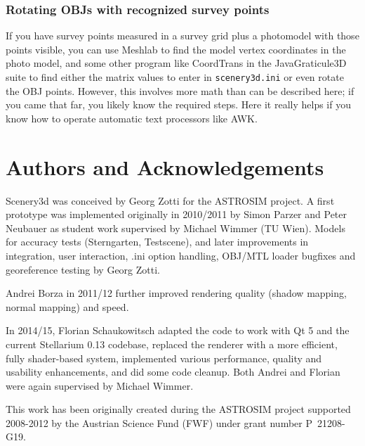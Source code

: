 \documentclass[a4paper]{article}
\newcommand{\filename}[1]{\texttt{#1}}
\begin{document}
\subsubsection{Rotating OBJs with recognized survey points}
\label{sec:RotatingOBJ}

If you have survey points measured in a survey grid plus a photomodel
with those points visible, you can use Meshlab to find the model
vertex coordinates in the photo model, and some other program like
CoordTrans in the JavaGraticule3D suite to find either the matrix
values to enter in \filename{scenery3d.ini} or even rotate the OBJ
points. However, this involves more math than can be described here;
if you came that far, you likely know the required steps.  Here it
really helps if you know how to operate automatic text processors like
AWK.

\section*{Authors and Acknowledgements}
\label{Acknowledgments}


Scenery3d was conceived by Georg Zotti for the ASTROSIM project. A first prototype was
implemented originally in 2010/2011 by Simon Parzer and Peter Neubauer as
student work supervised by Michael Wimmer (TU Wien). 
Models for accuracy tests (Sterngarten, Testscene), and later improvements in
integration, user interaction, .ini option handling, OBJ/MTL loader bugfixes and
georeference testing by Georg Zotti. 

Andrei Borza in 2011/12 further improved
rendering quality (shadow mapping, normal mapping) and speed. 

In 2014/15,
Florian Schaukowitsch adapted the code to work with Qt 5 and the current
Stellarium 0.13 codebase, replaced the renderer with a more efficient, fully
shader-based system, implemented various performance, quality and usability
enhancements, and did some code cleanup. Both Andrei and Florian were again
supervised by Michael Wimmer.

This work has been originally created during the ASTROSIM project supported 2008-2012 by
the Austrian Science Fund (FWF) under grant number P~21208-G19.
\end{document}
